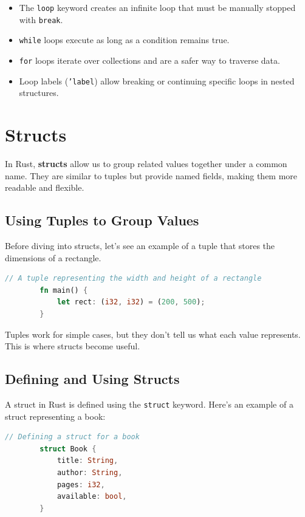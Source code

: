 \documentclass[a4paper,12pt]{report}
\begin{document}
	\begin{takeawaybox}
	
		\begin{itemize}
			\item The \texttt{loop} keyword creates an infinite loop that must be manually stopped with \texttt{break}.
			\item \texttt{while} loops execute as long as a condition remains true.
			\item \texttt{for} loops iterate over collections and are a safer way to traverse data.
			\item Loop labels (\texttt{'label}) allow breaking or continuing specific loops in nested structures.
		\end{itemize}
	\end{takeawaybox}
	
	
	
	\section{Structs}
	
	In Rust, \textbf{structs} allow us to group related values together under a common name. They are similar to tuples but provide named fields, making them more readable and flexible.
	
	\subsection*{Using Tuples to Group Values}
	Before diving into structs, let’s see an example of a tuple that stores the dimensions of a rectangle.
	
	\begin{lstlisting}[language=Rust]
		// A tuple representing the width and height of a rectangle
		fn main() {
			let rect: (i32, i32) = (200, 500);
		}
	\end{lstlisting}
	
	\noindent Tuples work for simple cases, but they don’t tell us what each value represents. This is where structs become useful.
	
	\subsection*{Defining and Using Structs}
	
	A struct in Rust is defined using the \texttt{struct} keyword. Here’s an example of a struct representing a book:
	
	\begin{lstlisting}[language=Rust]
		// Defining a struct for a book
		struct Book {
			title: String,
			author: String,
			pages: i32,
			available: bool,
		}
	\end{lstlisting}
	
\end{document}
